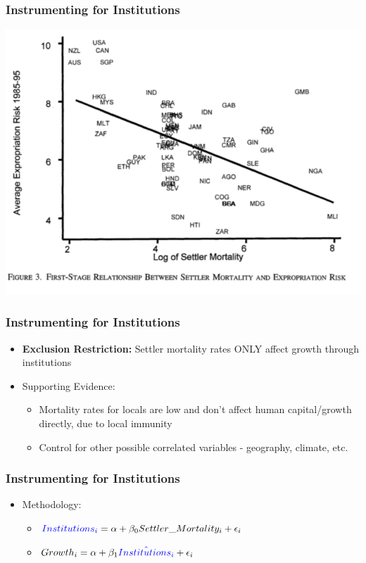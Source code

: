 \documentclass[xcolor=x11names,compress]{beamer}\usepackage[]{graphicx}\usepackage[]{color}
\renewcommand{\(}{\begin{columns}}
\renewcommand{\)}{\end{columns}}
\newcommand{\<}[1]{\begin{column}{#1}}
\renewcommand{\>}{\end{column}}
\begin{document}
\begin{frame}
\frametitle{Instrumenting for Institutions}
\includegraphics[scale=0.38]{AJR_first_stage.png}
\end{frame}

\begin{frame}
\frametitle{Instrumenting for Institutions}
\begin{itemize}
\item \textbf{Exclusion Restriction:} \pause Settler mortality rates ONLY affect growth through institutions
\pause
\item Supporting Evidence:
\begin{itemize}
\item Mortality rates for locals are low and don't affect human capital/growth directly, due to local immunity
\pause
\item Control for other possible correlated variables - geography, climate, etc.
\end{itemize}
\end{itemize}
\end{frame}

\begin{frame}
\frametitle{Instrumenting for Institutions}
\begin{itemize}
\item Methodology:
\begin{itemize}
\item ${\color{blue}Institutions_i} = \alpha + \beta_0 Settler\_Mortality_i + \epsilon_i$
\item $Growth_i = \alpha + \beta_1 {\color{blue}\hat{Institutions_i}} + \epsilon_i$
\end{itemize}
\end{itemize}
\end{frame}
\end{document}
